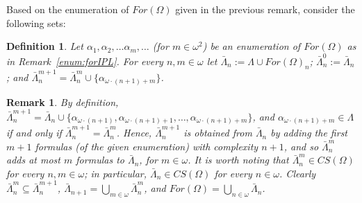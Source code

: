 \documentclass[12pt]{article}
\newtheorem{definition}[theorem]{Definition}
\newtheorem{remark}[theorem]{Remark}
\begin{document}
Based on the enumeration of $For(\Omega)$ given in the previous remark, consider the following sets:

\begin{definition}  \label{sets:enum:forIPL}
Let $\alpha_1,\alpha_2,\ldots \alpha_m, \ldots$ (for $m \in \omega^2$) be an enumeration of $For(\Omega)$ as in Remark~\ref{enum:forIPL}. For every $n,m \in \omega$ let  $\bar{\Lambda}_n:=\Lambda \cup For(\Omega)_n$;   $\bar{\Lambda}_n^0:=\bar{\Lambda}_n$; and $\bar{\Lambda}_n^{m+1}=\bar{\Lambda}_n^m \cup \{\alpha_{\omega\cdot (n+1) +m}\}$.
\end{definition}


\begin{remark} \label{enum2:forIPL} By definition, $\bar{\Lambda}_n^{m+1}=\bar{\Lambda}_n \cup \{\alpha_{\omega\cdot (n+1)}, \alpha_{\omega\cdot (n+1) +1}, \ldots, \alpha_{\omega\cdot (n+1) +m}\}$, and $\alpha_{\omega\cdot (n+1) +m}\in \Lambda$ if and only if $\bar{\Lambda}_n^{m+1}=\bar{\Lambda}_n^m$. Hence, $\bar{\Lambda}_n^{m+1}$ is obtained from $\bar{\Lambda}_n$ by adding the first $m+1$ formulas (of the given enumeration) with complexity $n+1$, and so $\bar{\Lambda}_n^{m}$ adds at most $m$ formulas to $\bar{\Lambda}_n$, for $m \in \omega$.
It is worth noting that $\bar{\Lambda}_n^m \in CS(\Omega)$ for every $n,m \in \omega$; in particular, $\bar{\Lambda}_n \in CS(\Omega)$ for every $n \in \omega$. Clearly $\bar{\Lambda}_n^m \subseteq \bar{\Lambda}_n^{m+1}$, $\bar{\Lambda}_{n+1} = \bigcup_{m \in \omega} \bar{\Lambda}_n^m$, and $For(\Omega)= \bigcup_{n \in \omega} \bar{\Lambda}_n$.
\end{remark}
 
\end{document}
